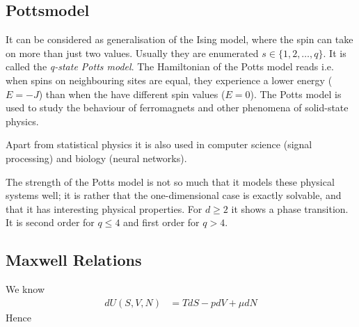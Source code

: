 \subsection{Pottsmodel}
It can be considered as generalisation of the Ising model, where the spin can take on more than just two values. Usually they are enumerated $s\in \{1,2,\ldots,q\}$. It is called the {\em q-state Potts model}. The   Hamiltonian of the Potts model reads
%
%
i.e. when spins on neighbouring sites are equal, they experience a lower energy ($E=-J$)
than when the have different spin values ($E=0$).
The Potts model is used to study  the behaviour of ferromagnets and other
phenomena of solid-state physics. 

Apart from statistical physics it is also used in computer science (signal processing) and biology (neural networks). 

The strength of the Potts model is not so much 
that it models these physical systems well; it is rather that the one-dimensional case is exactly 
solvable, and that it has interesting physical properties. For $d\ge 2$ it shows a phase transition.
It is second order for $q\le 4$ and first order for $q>4$.






\subsection{Maxwell Relations}

We know
%
\begin{align*}
d U(S,V,N) &= T dS -p dV +\mu dN
\end{align*}
%
Hence
%

